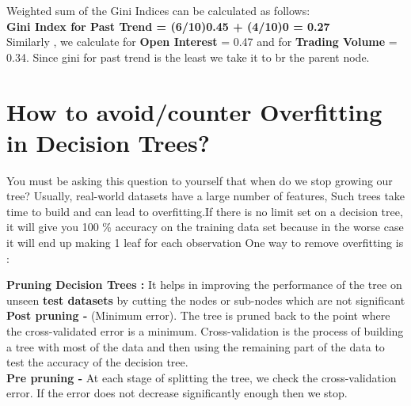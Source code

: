 \documentclass[a4paper, 11pt]{article}
\begin{document}
Weighted sum of the Gini Indices can be calculated as follows: \\
\textbf{Gini Index for Past Trend = (6/10)0.45 + (4/10)0 = 0.27} \vspace{2mm}\\
Similarly , we calculate for \textbf{Open Interest} = 0.47 and for \textbf{Trading Volume} = 0.34. Since gini for past trend is the least we take it to br the parent node.

\section{How to avoid/counter Overfitting in Decision Trees?} 
You must be asking this question to yourself that when do we stop growing our tree? Usually, real-world datasets have a large number of features,
Such trees take time to build and can lead to overfitting.If there is no limit set on a decision tree, it will give you 100 \% accuracy on the training data set because in the worse case it will end up making 1 leaf for each observation
One way to remove overfitting is :

\textbf{Pruning Decision Trees :}  It helps in improving the performance of the tree on unseen \textbf{test datasets} by cutting the nodes or sub-nodes which are not significant
\\ \textbf{Post pruning -} (Minimum error). The tree is pruned back to the point where the cross-validated error is a minimum. Cross-validation is the process of building a tree with most of the data and then using the remaining part of the data to test the accuracy of the decision tree.
\\ \textbf{Pre pruning -} At each stage of splitting the tree, we check the cross-validation error. If the error does not decrease significantly enough then we stop.




\end{document}
